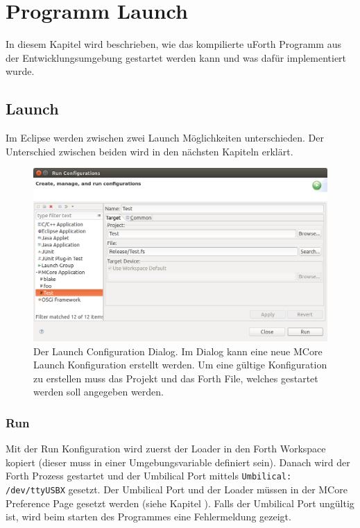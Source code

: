 \chapter{Programm Launch}
\label{chap:programlaunch}
In diesem Kapitel wird beschrieben, wie das kompilierte uForth Programm aus der Entwicklungsumgebung gestartet werden kann und was dafür implementiert wurde.

\section{Launch}

Im Eclipse werden zwischen zwei Launch Möglichkeiten unterschieden. Der Unterschied zwischen beiden wird in den nächsten Kapiteln erklärt.

\begin{figure}[H]
	\centering
		\includegraphics[scale=0.3]{launch/run.png}
		\caption{Der Launch Configuration Dialog. Im Dialog kann eine neue MCore Launch Konfiguration erstellt werden. Um eine gültige Konfiguration zu erstellen muss das Projekt und das Forth File, welches gestartet werden soll angegeben werden.}
		\label{fig:run}
\end{figure}

\newpage
\subsection{Run}

Mit der Run Konfiguration wird zuerst der Loader in den Forth Workspace kopiert (dieser muss in einer Umgebungsvariable definiert sein). Danach wird der Forth Prozess gestartet und der Umbilical Port mittels \verb!Umbilical: /dev/ttyUSBX! gesetzt. Der Umbilical Port und der Loader müssen in der MCore Preference Page gesetzt werden (siehe Kapitel ). Falls der Umbilical Port ungültig ist, wird beim starten des Programmes eine Fehlermeldung gezeigt.

